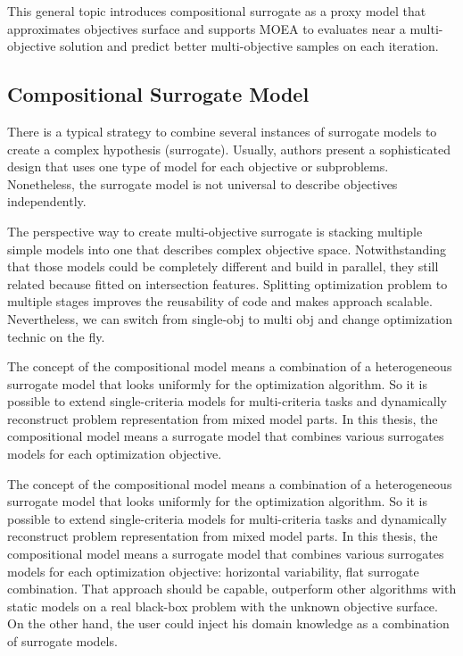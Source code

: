         This general topic introduces compositional surrogate as a proxy model that approximates objectives surface and supports MOEA to evaluates near a multi-objective solution and predict better multi-objective samples on each iteration.

        \subsection{Compositional Surrogate Model}
            There is a typical strategy to combine several instances of surrogate models to create a complex hypothesis (surrogate). Usually, authors present a sophisticated design that uses one type of model for each objective or subproblems. Nonetheless, the surrogate model is not universal to describe objectives independently. 

            The perspective way to create multi-objective surrogate is stacking multiple simple models into one that describes complex objective space. Notwithstanding that those models could be completely different and build in parallel, they still related because fitted on intersection features.
            Splitting optimization problem to multiple stages improves the reusability of code and makes approach scalable. Nevertheless, we can switch from single-obj to multi obj and change optimization technic on the fly.

            The concept of the compositional model means a combination of a heterogeneous surrogate model that looks uniformly for the optimization algorithm. So it is possible to extend single-criteria models for multi-criteria tasks and dynamically reconstruct problem representation from mixed model parts. In this thesis, the compositional model means a surrogate model that combines various surrogates models for each optimization objective.

            The concept of the compositional model means a combination of a heterogeneous surrogate model that looks uniformly for the optimization algorithm. So it is possible to extend single-criteria models for multi-criteria tasks and dynamically reconstruct problem representation from mixed model parts. In this thesis, the compositional model means a surrogate model that combines various surrogates models for each optimization objective: horizontal variability, flat surrogate combination. 
            That approach should be capable, outperform other algorithms with static models on a real black-box problem with the unknown objective surface. On the other hand, the user could inject his domain knowledge as a combination of surrogate models. 



